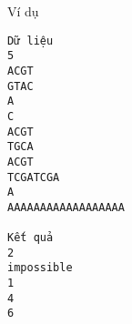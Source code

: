 Ví dụ
\begin{verbatim}
Dữ liệu
5
ACGT
GTAC
A
C
ACGT
TGCA
ACGT
TCGATCGA
A
AAAAAAAAAAAAAAAAAA

Kết quả
2
impossible
1
4
6
\end{verbatim}